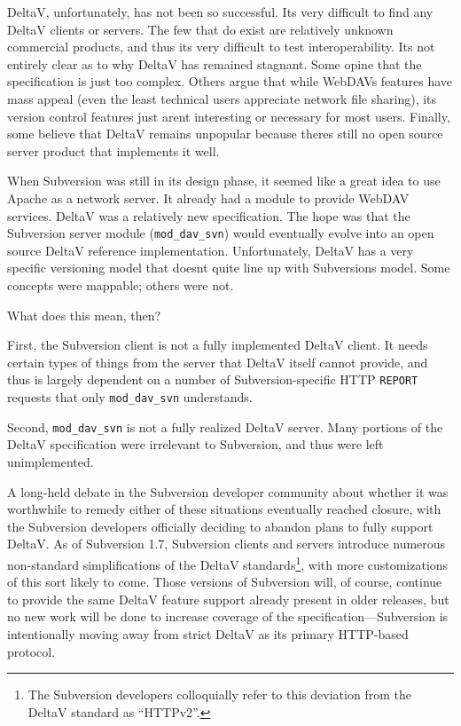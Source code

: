 DeltaV, unfortunately, has not been so successful. It\textquotesingle s
very difficult to find any DeltaV clients or servers. The few that do
exist are relatively unknown commercial products, and thus
it\textquotesingle s very difficult to test interoperability.
It\textquotesingle s not entirely clear as to why DeltaV has remained
stagnant. Some opine that the specification is just too complex. Others
argue that while WebDAV\textquotesingle s features have mass appeal
(even the least technical users appreciate network file sharing), its
version control features just aren\textquotesingle t interesting or
necessary for most users. Finally, some believe that DeltaV remains
unpopular because there\textquotesingle s still no open source server
product that implements it well.

When Subversion was still in its design phase, it seemed like a great
idea to use Apache as a network server. It already had a module to
provide WebDAV services. DeltaV was a relatively new specification. The
hope was that the Subversion server module (\texttt{mod\_dav\_svn})
would eventually evolve into an open source DeltaV reference
implementation. Unfortunately, DeltaV has a very specific versioning
model that doesn\textquotesingle t quite line up with
Subversion\textquotesingle s model. Some concepts were mappable; others
were not.

What does this mean, then?

First, the Subversion client is not a fully implemented DeltaV client.
It needs certain types of things from the server that DeltaV itself
cannot provide, and thus is largely dependent on a number of
Subversion-specific HTTP \texttt{REPORT} requests that only
\texttt{mod\_dav\_svn} understands.

Second, \texttt{mod\_dav\_svn} is not a fully realized DeltaV server.
Many portions of the DeltaV specification were irrelevant to Subversion,
and thus were left unimplemented.

A long-held debate in the Subversion developer community about whether
it was worthwhile to remedy either of these situations eventually
reached closure, with the Subversion developers officially deciding to
abandon plans to fully support DeltaV. As of Subversion 1.7, Subversion
clients and servers introduce numerous non-standard simplifications of
the DeltaV standards\footnote{The Subversion developers colloquially
  refer to this deviation from the DeltaV standard as ``HTTPv2''.}, with
more customizations of this sort likely to come. Those versions of
Subversion will, of course, continue to provide the same DeltaV feature
support already present in older releases, but no new work will be done
to increase coverage of the specification---Subversion is intentionally
moving away from strict DeltaV as its primary HTTP-based protocol.

